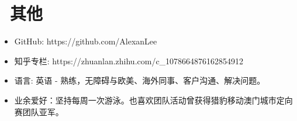 \documentclass{resume}
\begin{document}
\section{\faInfo\ 其他}
\begin{itemize}[parsep=0.5ex]
  \item GitHub: https://github.com/AlexanLee
  \item 知乎专栏: https://zhuanlan.zhihu.com/c\_1078664876162854912
  \item 语言: 英语 - 熟练，无障碍与欧美、海外同事、客户沟通、解决问题。
  \item 业余爱好：坚持每周一次游泳。也喜欢团队活动曾获得猎豹移动澳门城市定向赛团队亚军。
\end{itemize}

%
%
\end{document}
